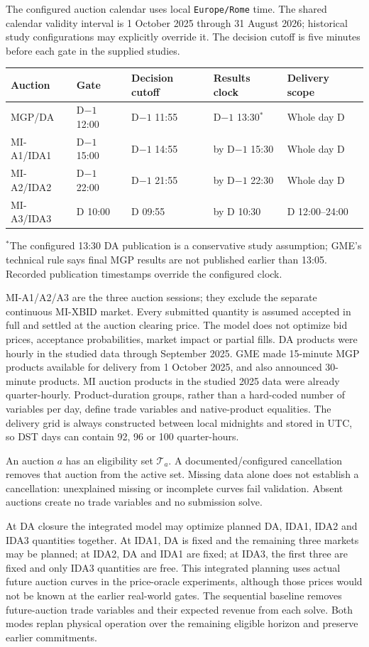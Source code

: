 \documentclass[11pt,a4paper]{article}
\begin{document}
The configured auction calendar uses local \texttt{Europe/Rome} time. The shared
calendar validity interval is 1 October 2025 through 31 August 2026; historical
study configurations may explicitly override it. The
decision cutoff is five minutes before each gate in the supplied studies.
\begin{center}
\begin{tabular}{lllll}
\toprule Auction & Gate & Decision cutoff & Results clock & Delivery scope\\
\midrule
MGP/DA & D$-1$ 12:00 & D$-1$ 11:55 & D$-1$ 13:30$^*$ & Whole day D\\
MI-A1/IDA1 & D$-1$ 15:00 & D$-1$ 14:55 & by D$-1$ 15:30 & Whole day D\\
MI-A2/IDA2 & D$-1$ 22:00 & D$-1$ 21:55 & by D$-1$ 22:30 & Whole day D\\
MI-A3/IDA3 & D 10:00 & D 09:55 & by D 10:30 & D 12:00--24:00\\
\bottomrule
\end{tabular}
\end{center}
\noindent $^*$The configured 13:30 DA publication is a conservative study
assumption; GME's technical rule says final MGP results are not published
earlier than 13:05. Recorded publication timestamps override the configured
clock.

MI-A1/A2/A3 are the three auction sessions; they exclude the separate
continuous MI-XBID market. Every submitted quantity is assumed accepted in full
and settled at the auction clearing price. The model does not optimize bid
prices, acceptance probabilities, market impact or partial fills. DA products
were hourly in the studied data through September 2025. GME made 15-minute MGP
products available for delivery from 1 October 2025, and also announced
30-minute products. MI auction products in the studied 2025 data were already
quarter-hourly. Product-duration groups, rather than a hard-coded number of
variables per day, define trade variables and native-product equalities. The
delivery grid is always constructed between local midnights and stored in UTC,
so DST days can contain 92, 96 or 100 quarter-hours.

An auction $a$ has an eligibility set $\mathcal T_a$. A documented/configured
cancellation removes that auction from the active set. Missing data alone does
not establish a cancellation: unexplained missing or incomplete curves fail
validation. Absent auctions create no trade variables and no submission solve.

At DA closure the integrated model may optimize planned DA, IDA1, IDA2 and
IDA3 quantities together. At IDA1, DA is fixed and the remaining three markets
may be planned; at IDA2, DA and IDA1 are fixed; at IDA3, the first three are
fixed and only IDA3 quantities are free. This integrated planning uses actual
future auction curves in the price-oracle experiments, although those prices
would not be known at the earlier real-world gates. The sequential baseline
removes future-auction trade variables and their expected revenue from each
solve. Both modes replan physical operation over the remaining eligible
horizon and preserve earlier commitments.
\end{document}
